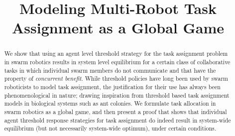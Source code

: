 \documentclass[conference]{ieeeconf}
\begin{document}
\title{Modeling Multi-Robot Task Assignment as a Global Game}

\author{
\and
{}
}

\maketitle

\begin{abstract}
We show that using an agent level threshold strategy for the task assignment problem in swarm robotics results in system level equilibrium for a certain class of collaborative tasks in which individual swarm members do not communicate and that have the property of \emph{concurrent benefit}. While threshold policies have long been used by swarm roboticists to model task assignment, the justification for their use has always been phenomenological in nature; drawing inspiration from threshold based task assignment models in biological systems such as ant colonies. We formulate task allocation in swarm robotics as a global game, and then present a proof that shows that individual agent threshold response strategies for task assignment do indeed result in system-wide equilibrium (but not necessarily system-wide optimum), under certain conditions.
\end{abstract}

\IEEEpeerreviewmaketitle

\end{document}
